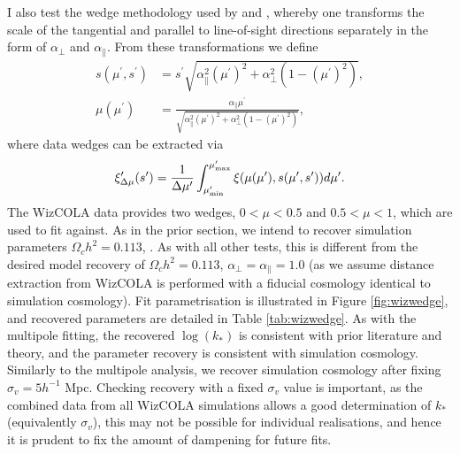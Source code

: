 \documentclass[titlesmallcaps, examinerscopy, copyrightpage]{uqthesis}
\begin{document}
I also test the wedge methodology used by \citet{SanchezKazinBeutler2013} and \citet{KazinSanchezCuesta2013}, whereby one transforms the scale of the tangential and parallel to line-of-sight directions separately in the form of $\alpha_\perp$ and $\alpha_\parallel$. From these transformations we define
\begin{align}
s(\mu^\prime, s^\prime) &= s^\prime \sqrt{\alpha_\parallel^2(\mu^\prime)^2 + \alpha_\perp^2 (1 - (\mu^\prime)^2)}, \\
\mu(\mu^\prime) &= \frac{\alpha_\parallel \mu^\prime}{\sqrt{\alpha_\parallel^2(\mu^\prime)^2 + \alpha_\perp^2 (1 - (\mu^\prime)^2)}},
\end{align}
where data wedges can be extracted via
\begin{align}
\xi^\prime_{\Delta \mu}(s^\prime) = \frac{1}{\Delta \mu^\prime} \int_{\mu^\prime_{\rm{min}}}^{\mu^\prime_{\rm{max}}} \xi(\mu(\mu^\prime), s(\mu^\prime, s^\prime)) d\mu^\prime.
\end{align}
The WizCOLA data provides two wedges, $0 < \mu < 0.5$ and $0.5 < \mu < 1$, which are used to fit against. As in the prior section, we intend to recover simulation parameters $\Omega_c h^2 = 0.113$, . As with all other tests, this is different from the desired model recovery of $\Omega_c h^2 = 0.113$, $\alpha_\perp = \alpha_\parallel = 1.0$ (as we assume distance extraction from WizCOLA is performed with a fiducial cosmology identical to simulation cosmology). Fit parametrisation is illustrated in Figure \ref{fig:wizwedge}, and recovered parameters are detailed in Table \ref{tab:wizwedge}. As with the multipole fitting, the recovered $\log(k_*)$ is consistent with prior literature and theory, and the parameter recovery is consistent with simulation cosmology. Similarly to the multipole analysis, we recover simulation cosmology after fixing $\sigma_v = 5 h^{-1}$ Mpc. Checking recovery with a fixed $\sigma_v$ value is important, as the combined data from all WizCOLA simulations allows a good determination of $k_*$ (equivalently $\sigma_v$), this may not be possible for individual realisations, and hence it is prudent to fix the amount of dampening for future fits.
\end{document}
